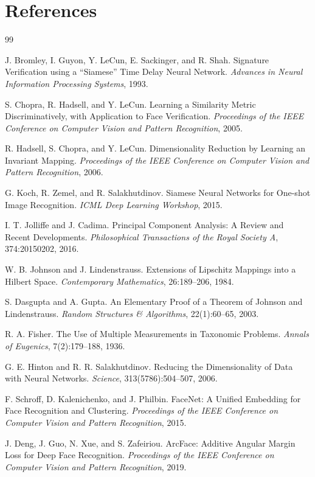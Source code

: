 \documentclass[10pt,a4paper]{article}
\begin{document}
\section*{References}
\begin{thebibliography}{99}

J. Bromley, I. Guyon, Y. LeCun, E. Sackinger, and R. Shah.
Signature Verification using a ``Siamese'' Time Delay Neural Network.
\emph{Advances in Neural Information Processing Systems}, 1993.

S. Chopra, R. Hadsell, and Y. LeCun.
Learning a Similarity Metric Discriminatively, with Application to Face Verification.
\emph{Proceedings of the IEEE Conference on Computer Vision and Pattern Recognition}, 2005.

R. Hadsell, S. Chopra, and Y. LeCun.
Dimensionality Reduction by Learning an Invariant Mapping.
\emph{Proceedings of the IEEE Conference on Computer Vision and Pattern Recognition}, 2006.

G. Koch, R. Zemel, and R. Salakhutdinov.
Siamese Neural Networks for One-shot Image Recognition.
\emph{ICML Deep Learning Workshop}, 2015.

I. T. Jolliffe and J. Cadima.
Principal Component Analysis: A Review and Recent Developments.
\emph{Philosophical Transactions of the Royal Society A}, 374:20150202, 2016.

W. B. Johnson and J. Lindenstrauss.
Extensions of Lipschitz Mappings into a Hilbert Space.
\emph{Contemporary Mathematics}, 26:189--206, 1984.

S. Dasgupta and A. Gupta.
An Elementary Proof of a Theorem of Johnson and Lindenstrauss.
\emph{Random Structures \& Algorithms}, 22(1):60--65, 2003.

R. A. Fisher.
The Use of Multiple Measurements in Taxonomic Problems.
\emph{Annals of Eugenics}, 7(2):179--188, 1936.

G. E. Hinton and R. R. Salakhutdinov.
Reducing the Dimensionality of Data with Neural Networks.
\emph{Science}, 313(5786):504--507, 2006.

F. Schroff, D. Kalenichenko, and J. Philbin.
FaceNet: A Unified Embedding for Face Recognition and Clustering.
\emph{Proceedings of the IEEE Conference on Computer Vision and Pattern Recognition}, 2015.

J. Deng, J. Guo, N. Xue, and S. Zafeiriou.
ArcFace: Additive Angular Margin Loss for Deep Face Recognition.
\emph{Proceedings of the IEEE Conference on Computer Vision and Pattern Recognition}, 2019.


\end{thebibliography}
\end{document}
